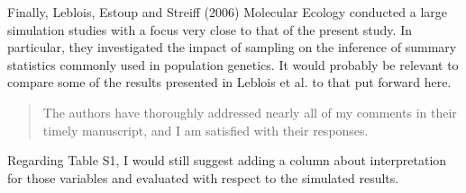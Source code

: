\reply{
}


\begin{point}{}
Finally, Leblois, Estoup and Streiff (2006) Molecular Ecology conducted a large simulation studies with a focus very close to that of the present study. In particular, they investigated the impact of sampling on the inference of summary statistics commonly used in population genetics. It would probably be relevant to compare some of the results presented in Leblois et al. to that put forward here.
\end{point}

\reply{
}





\begin{quote}
The authors have thoroughly addressed nearly all of my comments in their timely manuscript, and I am satisfied with their responses.
\end{quote}

\begin{point}{}
Regarding Table S1, I would still suggest adding a column about interpretation for those variables and evaluated with respect to the simulated results.
\end{point}

\reply{
}


